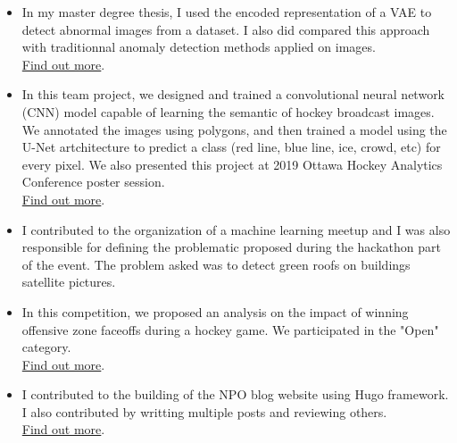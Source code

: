 \begin{itemize}
\item In my master degree thesis, I used the encoded representation of a VAE to detect abnormal images from a dataset. I also did compared this approach with traditionnal anomaly detection methods applied on images.\\ \href{https://github.com/stecaron/deep-stat-thesis/blob/master/rapports/main-memoire.pdf}{Find out more}.
\end{itemize}
\smallskip
\smallskip
{}
\begin{itemize}
\item In this team project, we designed and trained a convolutional neural network (CNN) model capable of learning the semantic of hockey broadcast images. We annotated the images using polygons, and then trained a model using the U-Net artchitecture to predict a class (red line, blue line, ice, crowd, etc) for every pixel. We also presented this project at 2019 Ottawa Hockey Analytics Conference poster session. \\ \href{https://github.com/stecaron/glo-7030-projet/blob/master/pancarte/main-pancarte.pdf}{Find out more}.
\end{itemize}
\smallskip
\smallskip
{}
\begin{itemize}
\item I contributed to the organization of a machine learning meetup and I was also responsible for defining the problematic proposed during the hackathon part of the event. The problem asked was to detect green roofs on buildings satellite pictures.
\end{itemize}
\smallskip
\smallskip
{}
\begin{itemize}
\item In this competition, we proposed an analysis on the impact of winning offensive zone faceoffs during a hockey game. We participated in the "Open" category.  \\ \href{https://github.com/dot-layer/bigdatacup-2021/blob/main/report/CaronLeCavalierPerreault-BigDataCup2021.pdf}{Find out more}.
\end{itemize}
\smallskip
\smallskip
{}
\begin{itemize}
\item I contributed to the building of the NPO blog website using Hugo framework. I also contributed by writting multiple posts and reviewing others. \\ \href{https://www.dotlayer.org/en/}{Find out more}.
\end{itemize}
\smallskip
\smallskip
